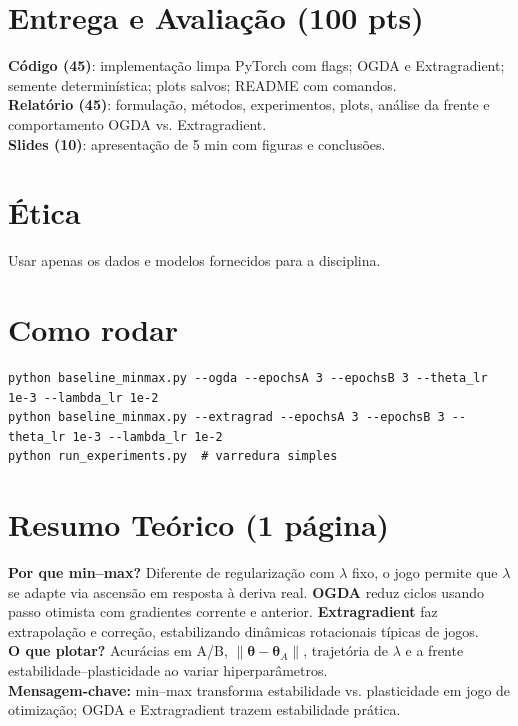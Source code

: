 \documentclass[9pt,a4paper]{extarticle}
\begin{document}
\section*{Entrega e Avaliação (100 pts)}
\textbf{Código (45)}: implementação limpa PyTorch com flags; OGDA e Extragradient; semente determinística; plots salvos; README com comandos.\\
\textbf{Relatório (45)}: formulação, métodos, experimentos, plots, análise da frente e comportamento OGDA vs. Extragradient.\\
\textbf{Slides (10)}: apresentação de 5 min com figuras e conclusões.

\section*{Ética}
Usar apenas os dados e modelos fornecidos para a disciplina.

\section*{Como rodar}
\begin{verbatim}
python baseline_minmax.py --ogda --epochsA 3 --epochsB 3 --theta_lr 1e-3 --lambda_lr 1e-2
python baseline_minmax.py --extragrad --epochsA 3 --epochsB 3 --theta_lr 1e-3 --lambda_lr 1e-2
python run_experiments.py  # varredura simples
\end{verbatim}

\section*{Resumo Teórico (1 página)}
\textbf{Por que min--max?} Diferente de regularização com $\lambda$ fixo, o jogo permite que $\lambda$ se adapte via ascensão em resposta à deriva real. \textbf{OGDA} reduz ciclos usando passo otimista com gradientes corrente e anterior. \textbf{Extragradient} faz extrapolação e correção, estabilizando dinâmicas rotacionais típicas de jogos.\\
\textbf{O que plotar?} Acurácias em A/B, $\lVert\bm{\theta}-\bm{\theta}_A\rVert$, trajetória de $\lambda$ e a frente estabilidade--plasticidade ao variar hiperparâmetros.\\
\textbf{Mensagem-chave:} min--max transforma estabilidade vs. plasticidade em jogo de otimização; OGDA e Extragradient trazem estabilidade prática.

\clearpage
\appendix
\end{document}
